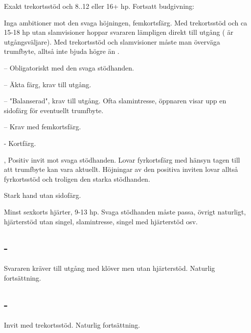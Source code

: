 Exakt trekortsstöd och 8..12 eller 16+ hp.
Fortsatt budgivning:
\begin{beskriv}
   \item[\hj{2}] Inga ambitioner mot den svaga höjningen, femkortsfärg. Med
                 trekortsstöd och ca 15-18 hp utan slamvisioner hoppar
svararen lämpligen direkt till utgång ( är utgångsväljare). Med
trekortsstöd och slamvisioner måste man överväga trumfbyte, alltså inte
bjuda högre än . 
	\begin{beskriv}
	   \item[--\pass] Obligatoriskt med den svaga stödhanden.
	   \item[--\spa{2}] Äkta färg, krav till utgång.
	   \item[--\NT{2}] "Balanserad", krav till utgång.
                           Ofta slamintresse, öppnaren visar upp en
                           sidofärg för eventuellt trumfbyte.
	   \item[--\la{3}] Krav med femkortsfärg.
	   \item[- \la{4}] Kortfärg.
	\end{beskriv}
   \item[\spa{2}, \la{3}] Positiv invit mot svaga stödhanden. Lovar
fyrkortsfärg med hänsyn tagen till att trumfbyte kan vara aktuellt.
Höjningar av den positiva inviten lovar alltså fyrkortsstöd och troligen
den starka stödhanden. 
   \item[\NT{2}] Stark hand utan sidofärg.
   \item[\hj{3}] Minst sexkorts hjärter, 9-13 hp. Svaga stödhanden måste
passa, övrigt naturligt,  hjärterstöd
utan singel, slamintresse,  singel med hjärterstöd osv.
\end{beskriv}

\subsection{ - }

Svararen kräver till utgång med klöver men utan hjärterstöd. Naturlig
fortsättning. 

\subsection{ - }

Invit med trekortsstöd. Naturlig fortsättning.


